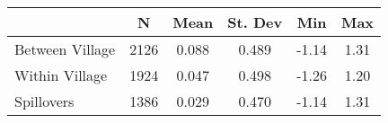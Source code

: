 \begin{tabular}{l*{5}{c}}\hline&\multicolumn{1}{c}{N}&\multicolumn{1}{c}{Mean}&\multicolumn{1}{c}{St. Dev}&\multicolumn{1}{c}{Min}&\multicolumn{1}{c}{Max}\\ \hline 
Between Village & 2126 & 0.088 & 0.489 & -1.14 & 1.31 \\
Within Village & 1924 & 0.047 & 0.498 & -1.26 & 1.20 \\
Spillovers & 1386 & 0.029 & 0.470 & -1.14 & 1.31 \\
\hline \end{tabular}
